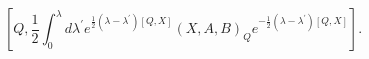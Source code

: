 \begin{equation} \left[
Q,\frac{1}{2}\int_{0}^{\lambda}d\lambda^{\prime}e^{\frac{1}{2}%
(\lambda-\lambda^{\prime})[Q,X]}(X,A,B)_{Q}e^{-\frac{1}{2}(\lambda
-\lambda^{\prime})[Q,X]}\right]  .\label{1.19}%
\end{equation}

